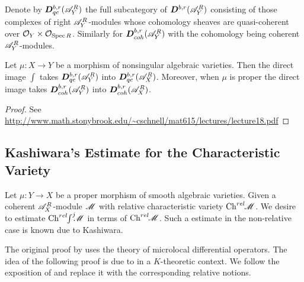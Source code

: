     Denote by $\boldsymbol{D}^{b,r}_{qc}(\mathscr{A}_Y^{R})$ the full subcategory of $\boldsymbol{D}^{b,r}(\mathscr{A}_Y^R)$ consisting of those complexes of right $\mathscr{A}_Y^R$-modules whose cohomology sheaves are quasi-coherent over $\mathcal{O}_Y\times \mathcal{O}_{\operatorname{Spec} R}$. Similarly for $\boldsymbol{D}^{b,r}_{coh}(\mathscr{A}_Y^R)$ with the cohomology being coherent $\mathscr{A}_Y^R$-modules.
    \begin{theorem}\label{thm: ConservationQuasiCoherentAndCoherentIfProper}
        Let $\mu:X\to Y$ be a morphism of nonsingular algebraic varieties. Then the direct image $\int$ takes $\boldsymbol{D}^{b,r}_{qc}(\mathscr{A}_Y^{R})$ into $\boldsymbol{D}^{b,r}_{qc}(\mathscr{A}_X^{R})$. Moreover, when $\mu$ is proper the direct image takes $\boldsymbol{D}^{b,r}_{coh}(\mathscr{A}_Y^R)$ into $\boldsymbol{D}^{b,r}_{coh}(\mathscr{A}_X^R)$.
    \end{theorem}
    \begin{proof}
      See \url{http://www.math.stonybrook.edu/~cschnell/mat615/lectures/lecture18.pdf}
    \end{proof}
\subsection{Kashiwara's Estimate for the Characteristic Variety}
Let $\mu:Y\to X$ be a proper morphism of smooth algebraic varieties. Given a coherent $\mathscr{A}_X^R$-module $\mathscr{M}$ with relative characteristic variety $\operatorname{Ch}^{rel}\mkern-5mu \mathscr{M}$. We desire to estimate $\operatorname{Ch}^{rel}\mkern-5mu \int^j \mkern -8mu \mathscr{M}$ in terms of $\operatorname{Ch}^{rel}\mkern-5mu\mathscr{M}$. Such a estimate in the non-relative case is known due to Kashiwara. %

The original proof by \cite{kashiwara1976b} uses the theory of microlocal differential operators. The idea of the following proof is due to \cite{malgrange1985images} in a $K$-theoretic context. We follow the exposition of \cite{sabbah2011introduction} and replace it with the corresponding relative notions. %
\\

